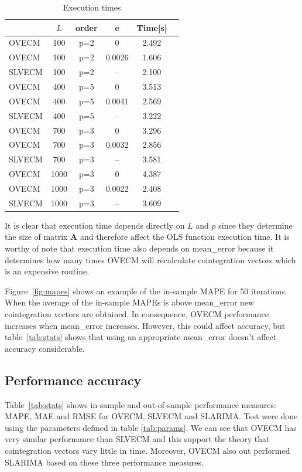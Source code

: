 \begin{table}[h!]
\caption{Execution times}
\label{tab:extimes}
\begin{center}
\begin{tabular}{|l|c|c|c|c|c|}
\hline
& $L$ & order & e  & Time[s] \\
\hline
OVECM & 100 &p=2  & 0      & 2.492\\
OVECM & 100 &p=2  & 0.0026  & 1.606\\
SLVECM & 100 &p=2& -- & 2.100\\
\hline
OVECM & 400 & p=5  & 0      & 3.513\\
OVECM & 400 &p=5  & 0.0041  & 2.569\\
SLVECM & 400 & p=5 & -- & 3.222\\
\hline
OVECM & 700 &p=3  & 0      & 3.296\\
OVECM & 700 &p=3  & 0.0032  & 2.856\\
SLVECM & 700 &p=3 & -- & 3.581\\
\hline
OVECM & 1000 & p=3 & 0      & 4.387\\
OVECM & 1000 & p=3  & 0.0022  & 2.408\\
SLVECM & 1000 & p=3  & -- & 3.609\\
\hline
\end{tabular}
\end{center}
\end{table}

It is clear that execution time depends directly on $L$ and $p$ since they
determine the size of matrix $\mathbf{A}$ and therefore affect the OLS function
execution time.
It is worthy of note that execution time also depends on mean\_error because it
determines how many times OVECM will recalculate cointegration vectors which is
an expensive routine.

Figure~\ref{fig:mapes} shows an example of the in-sample MAPE for 50 iterations.
When the average of the in-sample MAPEs is above mean\_error new cointegration
vectors are obtained. In consequence, OVECM performance increases when
mean\_error increases. However, this could affect accuracy, but
table~\ref{tab:stats} shows that using an appropriate mean\_error doesn't affect
accuracy considerable. 

\subsection{Performance accuracy} \label{sec:performacc}

Table~\ref{tab:stats} shows in-sample and out-of-sample performance measures:
MAPE, MAE and RMSE for OVECM, SLVECM and SLARIMA. Test were done using the
parameters defined in table \ref{tab:params}.  We can see that OVECM has very
similar performance than SLVECM and this support the theory that cointegration
vectors vary little in time. Moreover, OVECM also out performed SLARIMA based on
these three performance measures. 


